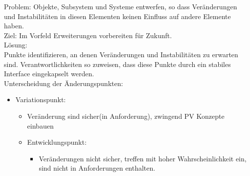 \documentclass[../ZF_SWEN1.tex]{subfiles}
\begin{document}
Problem: Objekte, Subsystem und Systeme entwerfen, so dass Veränderungen und Instabilitäten in diesen Elementen keinen Einfluss auf andere Elemente haben.\\
Ziel: Im Vorfeld Erweiterungen vorbereiten für Zukunft.\\

Lösung:\\

Punkte identifizieren, an denen Veränderungen und Instabilitäten zu erwarten sind. Verantwortlichkeiten so zuweisen, dass diese Punkte durch ein stabiles Interface eingekapselt werden.\\
Unterscheidung der Änderungspunkten:
\begin{itemize}
	\item Variationspunkt:
	\begin{itemize}
		\item Veränderung sind sicher(in Anforderung), zwingend PV Konzepte einbauen
		\item Entwicklungspunkt:
		\begin{itemize}
			\item Veränderungen nicht sicher, treffen mit hoher Wahrscheinlichkeit ein, sind nicht in Anforderungen enthalten.
		\end{itemize}
	\end{itemize}
\end{itemize}
\end{document}
